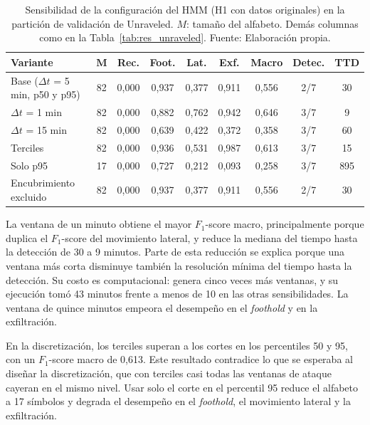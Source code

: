 \begin{table}[h!]
\centering
\small
\renewcommand{\arraystretch}{1.25}
\begin{tabular}{|l|c|c|c|c|c|c|c|c|}
\hline
\textbf{Variante} & $\boldsymbol{M}$ & \textbf{Rec.} & \textbf{Foot.} & \textbf{Lat.} & \textbf{Exf.} & \textbf{Macro} & \textbf{Detec.} & \textbf{TTD} \\ \hline
Base ($\Delta t$ = 5 min, p50 y p95) & 82 & 0,000 & 0,937 & 0,377 & 0,911 & 0,556 & 2/7 & 30 \\ \hline
$\Delta t$ = 1 min & 82 & 0,000 & 0,882 & 0,762 & 0,942 & 0,646 & 3/7 & 9 \\ \hline
$\Delta t$ = 15 min & 82 & 0,000 & 0,639 & 0,422 & 0,372 & 0,358 & 3/7 & 60 \\ \hline
Terciles & 82 & 0,000 & 0,936 & 0,531 & 0,987 & 0,613 & 3/7 & 15 \\ \hline
Solo p95 & 17 & 0,000 & 0,727 & 0,212 & 0,093 & 0,258 & 3/7 & 895 \\ \hline
Encubrimiento excluido & 82 & 0,000 & 0,937 & 0,377 & 0,911 & 0,556 & 2/7 & 30 \\ \hline
\end{tabular}
\caption[Sensibilidad de la configuración del HMM en la partición de validación de Unraveled.]{Sensibilidad de la configuración del HMM (H1 con datos originales) en la partición de validación de Unraveled. $M$: tamaño del alfabeto. Demás columnas como en la Tabla~\ref{tab:res_unraveled}. Fuente: Elaboración propia.}
\label{tab:sensibilidad}
\end{table}
\FloatBarrier

La ventana de un minuto obtiene el mayor $F_1$-score macro, principalmente porque duplica el $F_1$-score del movimiento lateral, y reduce la mediana del tiempo hasta la detección de 30 a 9 minutos. Parte de esta reducción se explica porque una ventana más corta disminuye también la resolución mínima del tiempo hasta la detección. Su costo es computacional: genera cinco veces más ventanas, y su ejecución tomó 43 minutos frente a menos de 10 en las otras sensibilidades. La ventana de quince minutos empeora el desempeño en el \textit{foothold} y en la exfiltración.

En la discretización, los terciles superan a los cortes en los percentiles 50 y 95, con un $F_1$-score macro de 0,613. Este resultado contradice lo que se esperaba al diseñar la discretización, que con terciles casi todas las ventanas de ataque cayeran en el mismo nivel. Usar solo el corte en el percentil 95 reduce el alfabeto a 17 símbolos y degrada el desempeño en el \textit{foothold}, el movimiento lateral y la exfiltración.

